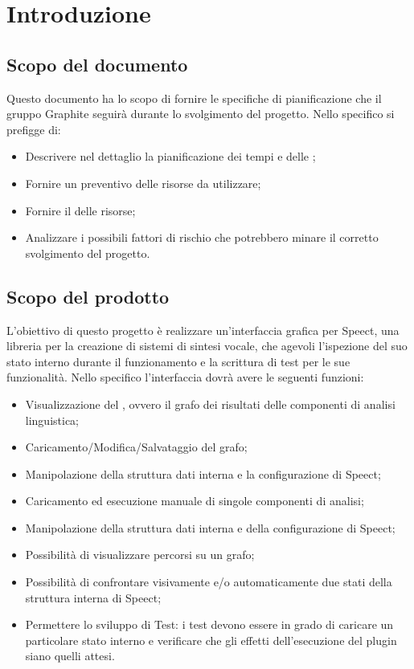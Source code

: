 \documentclass[./PianodiProgetto.tex]{subfiles}
\begin{document}
	
	\chapter{Introduzione}
	\section{Scopo del documento}
	Questo documento ha lo scopo di fornire le specifiche di pianificazione che il gruppo Graphite seguirà durante lo svolgimento del progetto. Nello specifico si prefigge di:
	
	\begin{itemize}
		\item Descrivere nel dettaglio la pianificazione dei tempi e delle ;
		\item Fornire un preventivo delle risorse da utilizzare;
		\item Fornire il  delle risorse;
		\item Analizzare i possibili fattori di rischio che potrebbero minare il corretto svolgimento del progetto.
	\end{itemize}
	
	\section{Scopo del prodotto}
	
	L'obiettivo di questo progetto è realizzare un'interfaccia grafica per Speect, una libreria per la creazione di sistemi di sintesi vocale, che agevoli l'ispezione del suo stato interno durante il funzionamento e la scrittura di test per le sue funzionalità.
	Nello specifico l'interfaccia dovrà avere le seguenti funzioni:
	\begin{itemize}
		\item Visualizzazione del , ovvero il grafo dei risultati delle componenti di analisi linguistica;
		\item Caricamento/Modifica/Salvataggio del grafo;
		\item Manipolazione della struttura dati interna e la configurazione di Speect;
		\item Caricamento ed esecuzione manuale di singole componenti di analisi;
		\item Manipolazione della struttura dati interna e della configurazione di Speect;
		\item Possibilità di visualizzare percorsi su un grafo;
		\item Possibilità di confrontare visivamente e/o automaticamente due stati della struttura interna di Speect;
		\item Permettere lo sviluppo di Test: i test devono essere in grado di caricare un particolare stato interno e verificare che gli effetti dell’esecuzione del plugin siano quelli attesi.
	\end{itemize}
	
\end{document}
